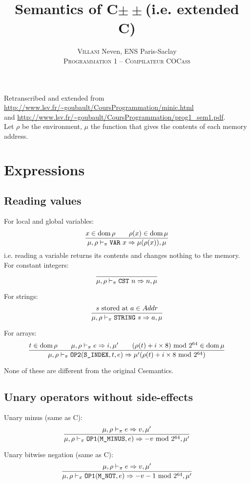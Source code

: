 

\newcommand{\Cpm}{C\(\pm\pm\)}
\newcommand{\Cmm}{C\textminus\textminus}

\title{Semantics of \Cpm (i.e. extended \Cmm)}
\author{\textsc{Villani} Neven, ENS Paris-Saclay\\\textsc{Programmation 1 -- Compilateur COCass}}


\maketitle

Retranscribed and extended from \url{http://www.lsv.fr/~goubault/CoursProgrammation/minic.html}\\
and \url{http://www.lsv.fr/~goubault/CoursProgrammation/prog1_sem1.pdf}.\\

Let \(\rho\) be the environment, \(\mu\) the function that gives the contents of each memory address.\\

\section{Expressions}
\subsection{Reading values}

For local and global variables:
\[\dfrac{x\in\operatorname{dom}\rho \qquad \rho(x)\in\operatorname{dom}\mu}{\mu,\rho\vdash_\pi \texttt{VAR}\ x\Rightarrow \mu(\rho(x)), \mu}\]
i.e. reading a variable returns its contents and changes nothing to the memory.\\

For constant integers:
\[\dfrac{}{\mu,\rho\vdash_\pi \texttt{CST}\ n\Rightarrow n, \mu}\]

For strings:
\[\dfrac{s\text{ stored at }a\in Addr}{\mu,\rho\vdash_\pi \texttt{STRING}\ s\Rightarrow a, \mu}\]

For arrays:
\[\dfrac{t\in\operatorname{dom}\rho \qquad \mu,\rho\vdash_\pi e\Rightarrow i,\mu' \qquad (\rho(t)+i\times 8)\text{ mod } 2^{64}\in\operatorname{dom}\mu}{\mu,\rho\vdash_\pi \texttt{OP2}(\texttt{S\_INDEX}, t, e) \Rightarrow \mu'(\rho(t)+i\times 8 \text{ mod } 2^{64})}\]

None of these are different from the original \Cmm semantics.

\subsection{Unary operators without side-effects}
Unary minus (same as \Cmm):
\[\dfrac{\mu,\rho\vdash_\pi e \Rightarrow v,\mu'}{\mu,\rho\vdash_\pi \texttt{OP1}(\texttt{M\_MINUS}, e) \Rightarrow -v \text{ mod } 2^{64},\mu'}\]

Unary bitwise negation (same as \Cmm):
\[\dfrac{\mu,\rho\vdash_\pi e\Rightarrow v,\mu'}{\mu,\rho\vdash_\pi \texttt{OP1}(\texttt{M\_NOT}, e) \Rightarrow -v-1 \text{ mod } 2^{64},\mu'}\]


